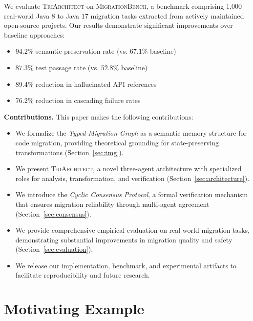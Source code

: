 \documentclass[sigconf,review,anonymous]{acmart}
\begin{document}
We evaluate \textsc{TriArchitect} on \textsc{MigrationBench}, a benchmark comprising 1,000 real-world Java 8 to Java 17 migration tasks extracted from actively maintained open-source projects. Our results demonstrate significant improvements over baseline approaches:

\begin{itemize}
    \item 94.2\% semantic preservation rate (vs. 67.1\% baseline)
    \item 87.3\% test passage rate (vs. 52.8\% baseline)
    \item 89.4\% reduction in hallucinated API references
    \item 76.2\% reduction in cascading failure rates
\end{itemize}

\textbf{Contributions.} This paper makes the following contributions:

\begin{itemize}
    \item We formalize the \textit{Typed Migration Graph} as a semantic memory structure for code migration, providing theoretical grounding for state-preserving transformations (Section~\ref{sec:tmg}).
    
    \item We present \textsc{TriArchitect}, a novel three-agent architecture with specialized roles for analysis, transformation, and verification (Section~\ref{sec:architecture}).
    
    \item We introduce the \textit{Cyclic Consensus Protocol}, a formal verification mechanism that ensures migration reliability through multi-agent agreement (Section~\ref{sec:consensus}).
    
    \item We provide comprehensive empirical evaluation on real-world migration tasks, demonstrating substantial improvements in migration quality and safety (Section~\ref{sec:evaluation}).
    
    \item We release our implementation, benchmark, and experimental artifacts to facilitate reproducibility and future research.
\end{itemize}

\section{Motivating Example}
\label{sec:motivation}
\end{document}
